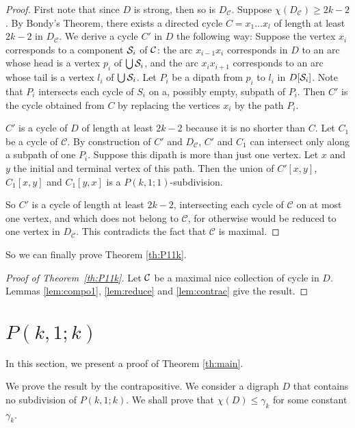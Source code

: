 \documentclass[utf8,10pt]{article}
\theoremstyle{plain}
\theoremstyle{definition}
\theoremstyle{remark}
\begin{document}
\begin{proof}
First note that since $D$ is strong, then so is $D_{\mathcal{C}}$. Suppose $\chi(D_{\mathcal{C}}) \geq 2k-2$. By Bondy's Theorem, there exists a directed cycle
$C = x_1\dots x_l$ of length at least $2k-2$ in $ D_{\mathcal{C}}$. We derive a cycle $C'$ in $D$ the following way:
Suppose the vertex $x_i$ corresponds to a component ${\cal S}_i$ of ${\cal C}$: the arc $x_{i-1}x_i$ corresponds in $D$ to an arc whose head
is a vertex $p_i$ of $\bigcup {\cal S}_i$, and the arc $x_ix_{i+1}$ corresponds to an arc whose tail is a vertex  $l_i$ of $\bigcup {\cal S}_i$. 
Let $P_i$ be a dipath 
from $p_i$ to $l_i$ in $D[{\cal S}_i]$. Note that $P_i$ intersects each cycle of $S_i$ on a, possibly empty, subpath of $P_i$. 
Then $C'$ is the cycle obtained from $C$ by replacing the vertices $x_i$ by the path $P_i$.

$C'$ is a cycle of $D$ of length at least $2k-2$ because it is no shorter than $C$. Let $C_1$ be a cycle of $\mathcal{C}$. By construction of $C'$ 
and $D_{\mathcal{C}}$, $C'$ and $C_1$ can intersect only along a subpath of one $P_i$. Suppose this dipath is more than just one vertex. Let $x$ and
$y$ the initial and terminal vertex of this path. Then the union of $C'[x,y]$,
$C_1[x,y]$ and $C_1[y,x]$ is a $P(k,1;1)$-subdivision.

So $C'$ is a cycle of length at least $2k-2$, intersecting each cycle of $\mathcal{C}$ on at most one vertex, and which does not belong to $\mathcal{C}$, for otherwise would be reduced
to one vertex in $D_{\mathcal{C}}$. This contradicts the fact that $\mathcal{C}$ is maximal.
\end{proof}

So we can finally prove Theorem \ref{th:P11k}.

\begin{proof}[Proof of Theorem~\ref{th:P11k}]
Let ${\cal C}$ be a maximal nice collection of cycle in $D$.  Lemmas \ref{lem:compo1}, \ref{lem:reduce} and \ref{lem:contrac} give the result.
\end{proof}


\section{$P(k,1;k)$}\label{sec:main}

In this section, we present a proof of Theorem \ref{th:main}.

We prove the result by the contrapositive. We consider a digraph $D$ that contains no subdivision of $P(k,1;k)$.
We shall prove that $\chi(D) \leq  \gamma_k$ for some constant $\gamma_k$.
\end{document}
